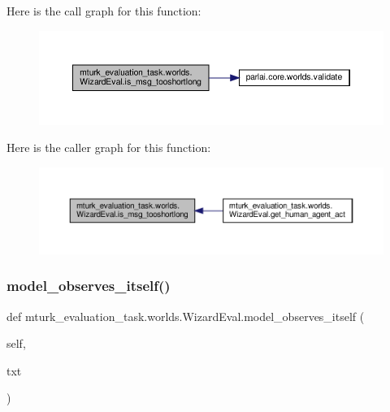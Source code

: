 Here is the call graph for this function\+:
\nopagebreak
\begin{figure}[H]
\begin{center}
\leavevmode
\includegraphics[width=350pt]{classmturk__evaluation__task_1_1worlds_1_1WizardEval_ad30c9575f816b5905836d78d35ac135e_cgraph}
\end{center}
\end{figure}
Here is the caller graph for this function\+:
\nopagebreak
\begin{figure}[H]
\begin{center}
\leavevmode
\includegraphics[width=350pt]{classmturk__evaluation__task_1_1worlds_1_1WizardEval_ad30c9575f816b5905836d78d35ac135e_icgraph}
\end{center}
\end{figure}
\mbox{\label{classmturk__evaluation__task_1_1worlds_1_1WizardEval_a42afcd4c9f3d9f3847bee129cec1d150}} 
\subsubsection{\texorpdfstring{model\+\_\+observes\+\_\+itself()}{model\_observes\_itself()}}
{\footnotesize\ttfamily def mturk\+\_\+evaluation\+\_\+task.\+worlds.\+Wizard\+Eval.\+model\+\_\+observes\+\_\+itself (\begin{DoxyParamCaption}\item[{}]{self,  }\item[{}]{txt }\end{DoxyParamCaption})}



